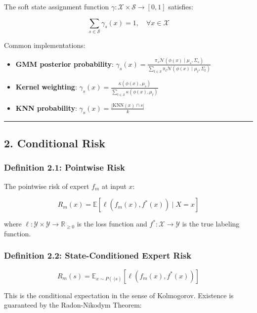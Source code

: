 \documentclass[
  12pt,
]{ctexart}
\providecommand{\tightlist}{%
  \setlength{\itemsep}{0pt}\setlength{\parskip}{0pt}}
\begin{document}
The soft state assignment function \(\gamma: \mathcal{X} \times \mathcal{S} \to [0,1]\)
satisfies:

\[\sum_{s \in \mathcal{S}} \gamma_s(x) = 1, \quad \forall x \in \mathcal{X}\]

Common implementations:

\begin{itemize}
\tightlist
\item
  \textbf{GMM posterior probability}: \(\gamma_s(x) = \frac{\pi_s \mathcal{N}(\phi(x) \mid \mu_s, \Sigma_s)}{\sum_{t \in \mathcal{S}} \pi_t \mathcal{N}(\phi(x) \mid \mu_t, \Sigma_t)}\)
\item
  \textbf{Kernel weighting}: \(\gamma_s(x) = \frac{\kappa(\phi(x), \mu_s)}{\sum_{t \in \mathcal{S}} \kappa(\phi(x), \mu_t)}\)
\item
  \textbf{KNN probability}: \(\gamma_s(x) = \frac{|\text{KNN}(x) \cap s|}{k}\)
\end{itemize}

\begin{center}\rule{0.5\linewidth}{0.5pt}\end{center}

\subsection{2. Conditional Risk}\label{conditional-risk}

\subsubsection{Definition 2.1: Pointwise Risk}\label{definition-2.1-pointwise-risk}

The pointwise risk of expert \(f_m\) at input \(x\):

\[R_m(x) = \mathbb{E}[\ell(f_m(x), f^*(x)) \mid X = x]\]

where \(\ell: \mathcal{Y} \times \mathcal{Y} \to \mathbb{R}_{\ge 0}\)
is the loss function and \(f^*: \mathcal{X} \to \mathcal{Y}\) is the true labeling function.

\subsubsection{Definition 2.2: State-Conditioned Expert Risk}\label{definition-2.2-state-conditioned-expert-risk}

\[R_m(s) = \mathbb{E}_{x \sim P(\cdot|s)}[\ell(f_m(x), f^*(x))]\]

This is the conditional expectation in the sense of Kolmogorov. Existence is guaranteed by the Radon-Nikodym Theorem:
\end{document}

